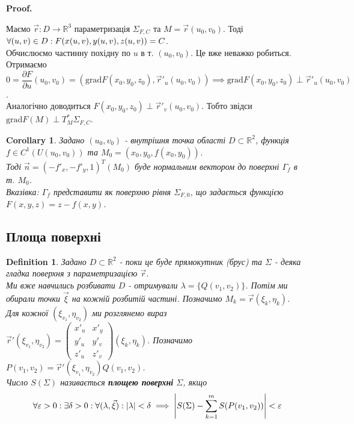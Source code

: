 \documentclass[a4paper, 10pt]{article}
\makeatletter
\def\departial#1#2{\dfrac{\partial {#1}}{\partial {#2}}}
\def\qed{$\blacksquare$}
\theoremstyle{theoremdd}
\theoremstyle{theoremdd}
\newtheorem{definition}[theorem]{Definition}
\theoremstyle{theoremdd}
\theoremstyle{theoremdd}
\theoremstyle{theoremdd}
\theoremstyle{theoremdd}
\theoremstyle{theoremdd}
\theoremstyle{theoremdd}
\theoremstyle{theoremdd}
\theoremstyle{theoremdd}
\theoremstyle{theoremdd}
\theoremstyle{theoremdd}
\theoremstyle{theoremdd}
\theoremstyle{theoremdd}
\newtheorem{corollary}[theorem]{Corollary}
\theoremstyle{theoremdd}
\renewenvironment{proof}[1][Proof.\\]{\par
\pushQED{\hfill \qed}%
\normalfont \topsep6\p@\@plus6\p@\relax
\trivlist
\item\relax
{\bfseries
#1\@addpunct{.}}\hspace\labelsep\ignorespaces
}{%
\popQED\endtrivlist\@endpefalse
}
\makeatother
\begin{document}
\begin{proof}
Маємо $\vec{r}: D \to \mathbb{R}^3$ параметризація $\Sigma_{F,C}$ та $M = \vec{r}(u_0,v_0)$. Тоді $\forall (u,v) \in D:\\ F(x(u,v), y(u,v), z(u,v)) = C$.\\
Обчислюємо частинну похідну по $u$ в т. $(u_0,v_0)$. Це вже неважко робиться. Отримаємо $0 = \departial{F}{u}(u_0,v_0) = \left( \text{grad} F(x_0,y_0,z_0), \vec{r}'_u(u_0,v_0) \right) \implies \text{grad} F(x_0,y_0,z_0) \perp \vec{r}'_u(u_0,v_0)$.\\
Аналогічно доводиться $F(x_0,y_0,z_0) \perp \vec{r}'_v(u_0,v_0)$. Тобто звідси $\text{grad} F(M) \perp T_M^* \Sigma_{F,C}$.
\end{proof}

\begin{corollary}
Задано $(u_0,v_0)$ - внутрішня точка області $D \subset \mathbb{R}^2$, функція $f \in C^1(U(u_0,v_0))$ та $M_0 = (x_0,y_0,f(x_0,y_0))$.\\
Тоді $\vec{n} = (-f'_x, -f'_y, 1)^T(M_0)$ буде нормальним вектором до поверхні $\Gamma_f$ в т. $M_0$.\\
\textit{Вказівка: $\Gamma_f$ представити як поверхню рівня $\Sigma_{F,0}$, що задається функцією $F(x,y,z) = z - f(x,y)$. }
\end{corollary}

\subsection{Площа поверхні}
\begin{definition}
Задано $D \subset \mathbb{R}^2$ - поки це буде прямокутник (брус) та $\Sigma$ - деяка гладка поверхня з параметризацією $\vec{r}$.\\
Ми вже навчились розбивати $D$ - отримували $\lambda = \{Q(v_1,v_2)\}$. Потім ми обирали точки $\vec{\xi}$ на кожній розбитій частині. Позначимо $M_k = \vec{r}(\xi_k,\eta_k)$.\\
Для кожної $(\xi_{v_1},\eta_{v_2})$ ми розглянемо вираз $\vec{r}'(\xi_{v_1},\eta_{v_2}) = \begin{pmatrix}
x'_u & x'_y \\
y'_u & y'_v \\
z'_u & z'_v
\end{pmatrix} (\xi_k, \eta_k)$. Позначимо $P(v_1,v_2) = \vec{r}'(\xi_{v_1},\eta_{v_2}) Q(v_1,v_2)$.\\
Число  $S(\Sigma)$ називається \textbf{площею поверхні} $\Sigma$, якщо
\begin{align*}
\forall \varepsilon > 0: \exists \delta > 0: \forall (\lambda,\vec{\xi}): |\lambda| < \delta \implies \abs{S(\Sigma) - \sum_{k=1}^m S(P(v_1,v_2))} < \varepsilon
\end{align*}
\end{definition}
\end{document}
